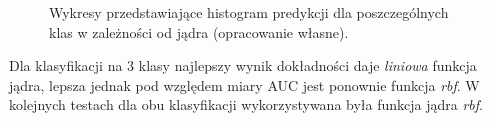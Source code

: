 \documentclass[a4paper, twoside, 11pt, openright]{article}
\begin{document}
\begin{figure}[H]%
\centering
{}%
\qquad
{}%

\caption{Wykresy przedstawiające histogram predykcji dla poszczególnych klas w zależności od jądra (opracowanie własne).}
\label{img:svm_kernel_histograms}
\end{figure}

Dla klasyfikacji na 3 klasy najlepszy wynik dokładności daje \textit{liniowa} funkcja jądra, lepsza jednak pod względem miary AUC jest ponownie funkcja \textit{rbf}. W kolejnych testach dla obu klasyfikacji wykorzystywana była funkcja jądra \textit{rbf}.
\end{document}
